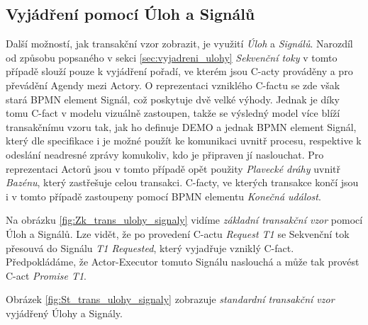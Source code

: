 \documentclass[]{article}
\begin{document}
\subsection{Vyjádření pomocí Úloh a Signálů}

Další možností, jak transakční vzor zobrazit, je využití \textit{Úloh} a \textit{Signálů}. Narozdíl od způsobu popsaného v sekci \ref{sec:vyjadreni_ulohy} \textit{Sekvenční toky} v tomto případě slouží pouze k vyjádření pořadí, ve kterém jsou C-acty prováděny a pro převádění Agendy mezi Actory. O reprezentaci vzniklého C-factu se zde však stará BPMN element Signál, což poskytuje dvě velké výhody. Jednak je díky tomu C-fact v modelu vizuálně zastoupen, takže se výsledný model více blíží transakčnímu vzoru tak, jak ho definuje DEMO a jednak BPMN element Signál, který dle specifikace \cite{Omg2011} i \cite{Silver2011} je možné použít ke komunikaci uvnitř procesu, respektive k odeslání neadresné zprávy komukoliv, kdo je připraven jí naslouchat. Pro reprezentaci Actorů jsou v tomto případě opět použity \textit{Plavecké dráhy} uvnitř \textit{Bazénu}, který zastřešuje celou transakci. C-facty, ve kterých transakce končí jsou i v tomto případě zastoupeny pomocí BPMN elementu \textit{Konečná událost}.

Na obrázku \ref{fig:Zk_trans_ulohy_signaly} vidíme \textit{základní transakční vzor} pomocí Úloh a Signálů. Lze vidět, že po provedení C-actu \textit{Request T1} se Sekvenční tok přesouvá do Signálu \textit{T1 Requested}, který vyjadřuje vzniklý C-fact. Předpokládáme, že Actor-Executor tomuto Signálu naslouchá a může tak provést C-act \textit{Promise T1}.

Obrázek \ref{fig:St_trans_ulohy_signaly} zobrazuje \textit{standardní transakční vzor} vyjádřený Úlohy a Signály.
\end{document}
